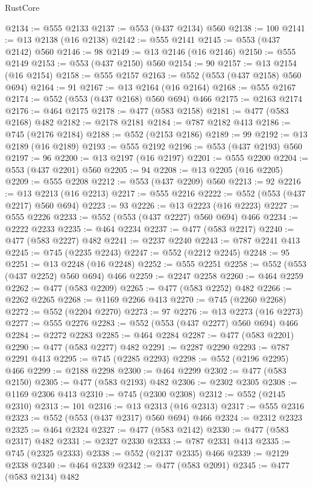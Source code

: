 \begin{lexlean}{RustCore}
\begin{coremodule}
@2134 := @555 @2133
@2137 := @553 (@437 @2134) @560
@2138 := 100
@2141 := @13 @2138 (@16 @2138)
@2142 := @555 @2141
@2145 := @553 (@437 @2142) @560
@2146 := 98
@2149 := @13 @2146 (@16 @2146)
@2150 := @555 @2149
@2153 := @553 (@437 @2150) @560
@2154 := 90
@2157 := @13 @2154 (@16 @2154)
@2158 := @555 @2157
@2163 := @552 (@553 (@437 @2158) @560 @694)
@2164 := 91
@2167 := @13 @2164 (@16 @2164)
@2168 := @555 @2167
@2174 := @552 (@553 (@437 @2168) @560 @694) @466
@2175 := @2163 @2174
@2176 := @464 @2175
@2178 := @477 (@583 @2158)
@2181 := @477 (@583 @2168) @482
@2182 := @2178 @2181
@2184 := @787 @2182 @413
@2186 := @745 (@2176 @2184)
@2188 := @552 (@2153 @2186)
@2189 := 99
@2192 := @13 @2189 (@16 @2189)
@2193 := @555 @2192
@2196 := @553 (@437 @2193) @560
@2197 := 96
@2200 := @13 @2197 (@16 @2197)
@2201 := @555 @2200
@2204 := @553 (@437 @2201) @560
@2205 := 94
@2208 := @13 @2205 (@16 @2205)
@2209 := @555 @2208
@2212 := @553 (@437 @2209) @560
@2213 := 92
@2216 := @13 @2213 (@16 @2213)
@2217 := @555 @2216
@2222 := @552 (@553 (@437 @2217) @560 @694)
@2223 := 93
@2226 := @13 @2223 (@16 @2223)
@2227 := @555 @2226
@2233 := @552 (@553 (@437 @2227) @560 @694) @466
@2234 := @2222 @2233
@2235 := @464 @2234
@2237 := @477 (@583 @2217)
@2240 := @477 (@583 @2227) @482
@2241 := @2237 @2240
@2243 := @787 @2241 @413
@2245 := @745 (@2235 @2243)
@2247 := @552 (@2212 @2245)
@2248 := 95
@2251 := @13 @2248 (@16 @2248)
@2252 := @555 @2251
@2258 := @552 (@553 (@437 @2252) @560 @694) @466
@2259 := @2247 @2258
@2260 := @464 @2259
@2262 := @477 (@583 @2209)
@2265 := @477 (@583 @2252) @482
@2266 := @2262 @2265
@2268 := @1169 @2266 @413
@2270 := @745 (@2260 @2268)
@2272 := @552 (@2204 @2270)
@2273 := 97
@2276 := @13 @2273 (@16 @2273)
@2277 := @555 @2276
@2283 := @552 (@553 (@437 @2277) @560 @694) @466
@2284 := @2272 @2283
@2285 := @464 @2284
@2287 := @477 (@583 @2201)
@2290 := @477 (@583 @2277) @482
@2291 := @2287 @2290
@2293 := @787 @2291 @413
@2295 := @745 (@2285 @2293)
@2298 := @552 (@2196 @2295) @466
@2299 := @2188 @2298
@2300 := @464 @2299
@2302 := @477 (@583 @2150)
@2305 := @477 (@583 @2193) @482
@2306 := @2302 @2305
@2308 := @1169 @2306 @413
@2310 := @745 (@2300 @2308)
@2312 := @552 (@2145 @2310)
@2313 := 101
@2316 := @13 @2313 (@16 @2313)
@2317 := @555 @2316
@2323 := @552 (@553 (@437 @2317) @560 @694) @466
@2324 := @2312 @2323
@2325 := @464 @2324
@2327 := @477 (@583 @2142)
@2330 := @477 (@583 @2317) @482
@2331 := @2327 @2330
@2333 := @787 @2331 @413
@2335 := @745 (@2325 @2333)
@2338 := @552 (@2137 @2335) @466
@2339 := @2129 @2338
@2340 := @464 @2339
@2342 := @477 (@583 @2091)
@2345 := @477 (@583 @2134) @482

\end{coremodule}
\end{lexlean}
